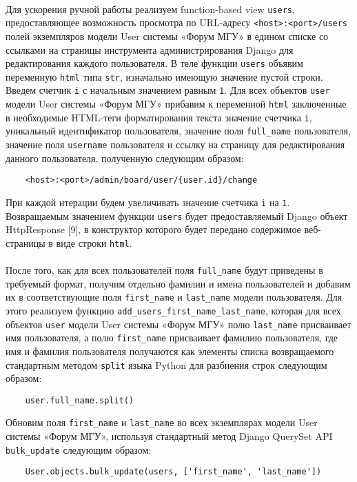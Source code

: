 \documentclass[12pt, a4paper, oneside]{article}
\begin{document}
\paragraph{}
Для ускорения ручной работы реализуем function-based view \texttt{users}, предоставляющее возможность просмотра по URL-адресу \texttt{<host>:<port>/users} полей экземпляров модели User системы «Форум МГУ» в едином списке со ссылками на страницы инструмента администрирования Django для редактирования каждого пользователя. В теле функции \texttt{users} объявим переменную \texttt{html} типа \texttt{str}, изначально имеющую значение пустой строки. Введем счетчик \texttt{i} с начальным значением равным \texttt{1}. Для всех объектов \texttt{user} модели User системы «Форум МГУ» прибавим к переменной \texttt{html} заключенные в необходимые HTML-теги форматирования текста значение счетчика \texttt{i}, уникальный идентификатор пользователя, значение поля \texttt{full\_name} пользователя, значение поля \texttt{username} пользователя и ссылку на страницу для редактирования данного пользователя, полученную следующим образом:
\begin{verbatim}
    <host>:<port>/admin/board/user/{user.id}/change
\end{verbatim}
При каждой итерации будем увеличивать значение счетчика \texttt{i} на \texttt{1}. Возвращаемым значением функции \texttt{users} будет предоставляемый Django объект HttpResponse [9], в конструктор которого будет передано содержимое веб-страницы в виде строки \texttt{html}.
\paragraph{}
После того, как для всех пользователей поля \texttt{full\_name} будут приведены в требуемый формат, получим отдельно фамилии и имена пользователей и добавим их в соответствующие поля \texttt{first\_name} и \texttt{last\_name} модели пользователя. Для этого реализуем функцию \texttt{add\_users\_first\_name\_last\_name}, которая для всех объектов \texttt{user} модели User системы «Форум МГУ» полю \texttt{last\_name} присваивает имя пользователя, а полю \texttt{first\_name} присваивает фамилию пользователя, где имя и фамилия пользователя получаются как элементы списка возвращаемого стандартным методом \texttt{split} языка Python для разбиения строк следующим образом:
\begin{verbatim}
    user.full_name.split()
\end{verbatim}
Обновим поля \texttt{first\_name} и \texttt{last\_name} во всех экземплярах модели User системы «Форум МГУ», используя стандартный метод Django QuerySet API \texttt{bulk\_update} следующим образом:
\begin{verbatim}
    User.objects.bulk_update(users, ['first_name', 'last_name'])
\end{verbatim}
\end{document}
